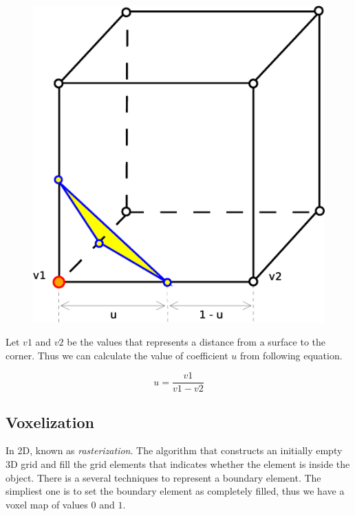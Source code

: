 \begin{figure}[ht]
\includegraphics[scale=0.5]{../img/marc_cub_inter.eps}
\end{figure}

Let $v1$ and $v2$ be the values that represents a distance from a surface to the corner.
Thus we can calculate the value of coefficient $u$ from following equation.

\begin{equation}
u = \frac{v1}{v1-v2}
\end{equation}


\subsection{Voxelization}

In 2D, known as \emph{rasterization}. The algorithm that constructs an initially empty 3D grid and fill 
the
grid elements that indicates whether the element is inside the object. There is a several techniques
to represent a boundary element. The simpliest one is to set the boundary element as completely filled, 
thus we have a voxel map of values $0$ and $1$.\\

